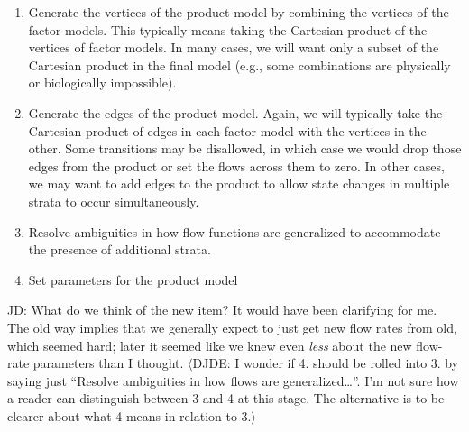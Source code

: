 \documentclass[pdflatex,sn-basic]{sn-jnl}%
\theoremstyle{definition}
\newcommand{\jd}[1]{{\color{blue} JD: #1}}
\newcommand{\david}[1]{{\color{cyan} $\langle$DJDE: #1$\rangle$}}
\begin{document}
\begin{enumerate}
    \item Generate the vertices of the product model by combining the vertices of the factor models. This typically means taking the Cartesian product of the vertices of factor models. In many cases, we will want only a subset of the Cartesian product in the final model (e.g., some combinations are physically or biologically impossible).
    \item Generate the edges of the product model. Again, we will typically take the Cartesian product of edges in each factor model with the vertices in the other. Some transitions may be disallowed, in which case we would drop those edges from the product or set the flows across them to zero. In other cases, we may want to add edges to the product to allow state changes in multiple strata to occur simultaneously.
    \item Resolve ambiguities in how flow functions are generalized to accommodate the presence of additional strata.
    \item Set parameters for the product model
\end{enumerate}
\jd{What do we think of the new item? It would have been clarifying for me. The old way implies that we generally expect to just get new flow rates from old, which seemed hard; later it seemed like we knew even \emph{less} about the new flow-rate parameters than I thought.}
\david{I wonder if 4. should be rolled into 3. by saying just ``Resolve ambiguities in how flows are generalized\dots''.  I'm not sure how a reader can distinguish between 3 and 4 at this stage. The alternative is to be clearer about what 4 means in relation to 3.}
\end{document}
